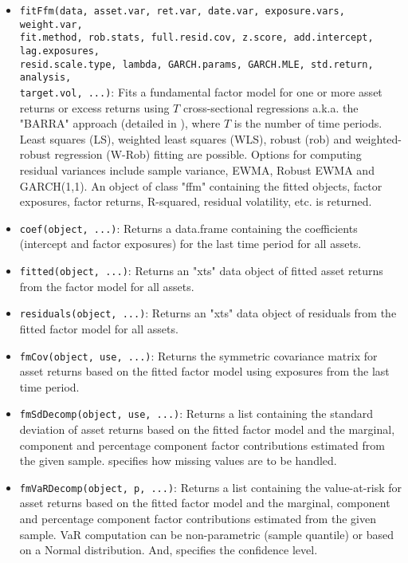 \documentclass[a4paper]{article}\usepackage[]{graphicx}\usepackage[]{color}
\begin{document}
\begin{itemize}

\item \verb"fitFfm(data, asset.var, ret.var, date.var, exposure.vars, weight.var, " \\ \verb"fit.method, rob.stats, full.resid.cov, z.score, add.intercept, lag.exposures, " \\ \verb"resid.scale.type, lambda, GARCH.params, GARCH.MLE, std.return, analysis, " \\ \verb"target.vol, ...)": Fits a fundamental factor model for one or more asset returns or excess returns using $T$ cross-sectional regressions a.k.a. the "BARRA" approach (detailed in \citet{grinold2000active}), where $T$ is the number of time periods. Least squares (LS), weighted least squares (WLS), robust (rob) and weighted-robust regression (W-Rob) fitting are possible. Options for computing residual variances include sample variance, EWMA, Robust EWMA and GARCH(1,1). An object of class "ffm" containing the fitted objects, factor exposures, factor returns, R-squared, residual volatility, etc. is returned.

\item \verb"coef(object, ...)": Returns a data.frame containing the coefficients (intercept and factor exposures) for the last time period for all assets.

\item \verb"fitted(object, ...)": Returns an "xts" data object of fitted asset returns from the factor model for all assets.

\item \verb"residuals(object, ...)": Returns an "xts" data object of residuals from the fitted factor model for all assets.

\item \verb"fmCov(object, use, ...)": Returns the  symmetric covariance matrix for asset returns based on the fitted factor model using exposures from the last time period.

\item \verb"fmSdDecomp(object, use, ...)": Returns a list containing the standard deviation of asset returns based on the fitted factor model and the marginal, component and percentage component factor contributions estimated from the given sample.  specifies how missing values are to be handled.

\item \verb"fmVaRDecomp(object, p, ...)": Returns a list containing the value-at-risk for asset returns based on the fitted factor model and the marginal, component and percentage component factor contributions estimated from the given sample. VaR computation can be non-parametric (sample quantile) or based on a Normal distribution. And,  specifies the confidence level.


\end{itemize}
\end{document}
